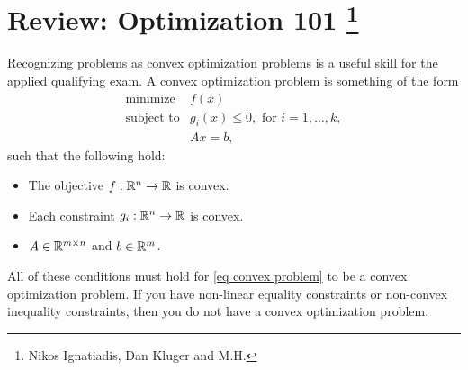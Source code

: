 \section{Review: Optimization 101 \footnote{Nikos Ignatiadis, Dan Kluger and M.H.}}\label{sec:Opt_review}

Recognizing problems as convex optimization problems is a useful skill for the applied qualifying exam. A convex optimization problem is something of the form
\begin{equation}\label{eq convex problem}
    \begin{array}{ll}
        \mbox{minimize} & f(x)\\
        \mbox{subject to} & g_i(x) \le 0, \text{ for } i=1,\ldots,k,\\
        & Ax = b,
    \end{array}
\end{equation}
such that the following hold:
\begin{itemize}
    \item The objective $f:\mathbb{R}^n \to \mathbb{R}$ is convex.
    \item Each constraint $g_i : \mathbb{R}^n \to \mathbb{R}$ is convex.
    \item $A\in \mathbb{R}^{m\times n}$ and $b \in \mathbb{R}^m$.
\end{itemize}
All of these conditions must hold for \eqref{eq convex problem} to be a convex optimization problem. If you have non-linear equality constraints or non-convex inequality constraints, then you do not have a convex optimization problem. 

